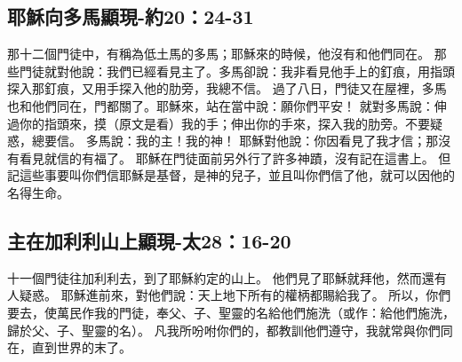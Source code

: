 \subsection{耶穌向多馬顯現-約20：24-31}

那十二個門徒中，有稱為低土馬的多馬；耶穌來的時候，他沒有和他們同在。
那些門徒就對他說：我們已經看見主了。多馬卻說：我非看見他手上的釘痕，用指頭探入那釘痕，又用手探入他的肋旁，我總不信。
過了八日，門徒又在屋裡，多馬也和他們同在，門都關了。耶穌來，站在當中說：願你們平安！
就對多馬說：伸過你的指頭來，摸（原文是看）我的手；伸出你的手來，探入我的肋旁。不要疑惑，總要信。
多馬說：我的主！我的神！
耶穌對他說：你因看見了我才信；那沒有看見就信的有福了。
耶穌在門徒面前另外行了許多神蹟，沒有記在這書上。
但記這些事要叫你們信耶穌是基督，是神的兒子，並且叫你們信了他，就可以因他的名得生命。

\subsection{主在加利利山上顯現-太28：16-20}
十一個門徒往加利利去，到了耶穌約定的山上。
他們見了耶穌就拜他，然而還有人疑惑。
耶穌進前來，對他們說：天上地下所有的權柄都賜給我了。
所以，你們要去，使萬民作我的門徒，奉父、子、聖靈的名給他們施洗（或作：給他們施洗，歸於父、子、聖靈的名）。
凡我所吩咐你們的，都教訓他們遵守，我就常與你們同在，直到世界的末了。

